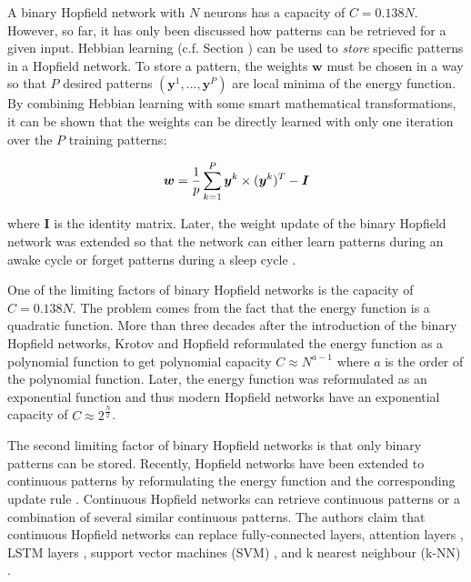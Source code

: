 A binary Hopfield network with \(N\) neurons has a capacity of \(C=0.138N\).
However, so far, it has only been discussed how patterns can be retrieved for a given input.
Hebbian learning (c.f. Section ) can be used to \emph{store} specific patterns in a Hopfield network.
To store a pattern, the weights \(\boldsymbol{w}\) must be chosen in a way so that $P$ desired patterns \((\boldsymbol{y}^1, ..., \boldsymbol{y}^P)\) are local minima of the energy function.
By combining Hebbian learning with some smart mathematical transformations, it can be shown that the weights can be directly learned with only one iteration over the $P$ training patterns:

\begin{equation}\eqlbl{hf_5}
	\boldsymbol{w} = \frac{1}{p} \sum_{k=1}^{P} \boldsymbol{y}^k \times (\boldsymbol{y}^k)^T - \boldsymbol{I}
\end{equation}

where \(\boldsymbol{I}\) is the identity matrix.
Later, the weight update of the binary Hopfield network was extended so that the network can either learn patterns during an awake cycle or forget patterns during a sleep cycle .

One of the limiting factors of binary Hopfield networks is the capacity of \(C=0.138N\).
The problem comes from the fact that the energy function is a quadratic function.
More than three decades after the introduction of the binary Hopfield networks, Krotov and Hopfield  reformulated the energy function as a polynomial function to get polynomial capacity \(C\approx N^{a-1}\) where \(a\) is the order of the polynomial function.
Later, the energy function was reformulated as an exponential function  and thus modern Hopfield networks have an exponential capacity of \(C\approx 2^{\frac{N}{2}}\).

The second limiting factor of binary Hopfield networks is that only binary patterns can be stored.
Recently, Hopfield networks have been extended to continuous patterns by reformulating the energy function and the corresponding update rule .
Continuous Hopfield networks can retrieve continuous patterns or a combination of several similar continuous patterns.
The authors claim that continuous Hopfield networks can replace fully-connected layers, attention layers \cite{10.5555/2969033.2969073}, LSTM layers \cite{Hochreiter_Schmidhuber_1997}, support vector machines (SVM) \cite{Cortes_Vapnik_1995}, and k nearest neighbour (k-NN) \cite{Cover_Hart_1967}.










